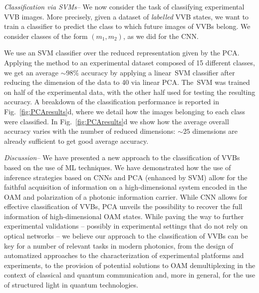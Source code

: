 \textit{Classification via SVMs--} We now consider the task of classifying experimental \ac{VVB} images. More precisely, given a dataset of \emph{labelled} \ac{VVB} states, we want to train a classifier to predict the class to which future images of \acp{VVB} belong.
We consider classes of the form $(m_1,m_2)$, as we did for the CNN.

We use an \ac{SVM} classifier over the reduced representation given by the \ac{PCA}. Applying the method to an experimental dataset composed of 15 different classes,
we get an average $\sim98\%$ accuracy by applying a linear~\ac{SVM} classifier after reducing the dimension of the data to 40 via linear \ac{PCA}.
The~\ac{SVM} was trained on half of the experimental data, with the other half used for testing the resulting accuracy. A breakdown of the classification performance is reported in Fig.~\ref{fig:PCAresults}d, where we detail how the images belonging to each class were classified. %
In Fig.~\ref{fig:PCAresults}d we show how the average overall accuracy varies with the number of reduced dimensions: $\sim 25$ dimensions are already sufficient  to get good average accuracy.


\textit{Discussion--} We have presented a new approach to the classification of VVBs based on the use of ML techniques. We have demonstrated how the use of inference strategies based on CNNs and PCA (enhanced by SVM) allow for the faithful acquisition of information on a high-dimensional system encoded in the OAM and polarization of a photonic information carrier. While CNN allows for effective classification of VVBs, PCA unveils the possibility to recover the full information of high-dimensional OAM states.
While paving the way to further experimental validations -- possibly in experimental settings that do not rely on optical networks -- we believe our approach to the classification of \ac{VVB}s can be key for a number of relevant tasks in modern photonics, from the design of automatized approaches to the characterization of experimental platforms and experiments, to the provision of potential solutions to OAM demultiplexing in the context of classical and quantum communication and, more in general, for the use of structured light in quantum technologies.
